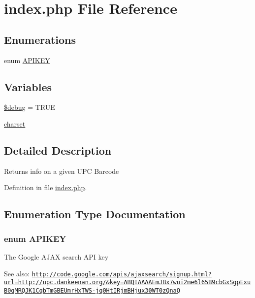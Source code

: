 \hypertarget{index_8php}{
\section{index.php File Reference}
\label{index_8php}
}
\subsection*{Enumerations}
\begin{CompactItemize}
\item 
enum \hyperlink{index_8php_cb68d0635f57ee9137fb7985a2357c5c}{APIKEY} 
\end{CompactItemize}
\subsection*{Variables}
\begin{CompactItemize}
\item 
\hyperlink{index_8php_85ae3e64cd40e9564adceb010085e9dd}{\$debug} = TRUE
\item 
\hyperlink{index_8php_8bd4accafd4e712317ed9a471738a971}{charset}
\end{CompactItemize}


\subsection{Detailed Description}
Returns info on a given UPC Barcode 

Definition in file \hyperlink{index_8php-source}{index.php}.

\subsection{Enumeration Type Documentation}
\hypertarget{index_8php_cb68d0635f57ee9137fb7985a2357c5c}{
\subsubsection{\setlength{\rightskip}{0pt plus 5cm}enum {\bf APIKEY}}}
\label{index_8php_cb68d0635f57ee9137fb7985a2357c5c}


The Google AJAX search API key \begin{Desc}
\item[See also:]\href{http://code.google.com/apis/ajaxsearch/signup.html?url=http://upc.dankeenan.org/&key=ABQIAAAAEmJBx7wui2me6l65B9cbGxSgpExuB0qMRQJK1CqbTmGBEUmrHxTWS-jq0HtIRjmBHjux30WT0zQnaQ}{\tt http://code.google.com/apis/ajaxsearch/signup.html?url=http://upc.dankeenan.org/\&key=ABQIAAAAEmJBx7wui2me6l65B9cbGxSgpExuB0qMRQJK1CqbTmGBEUmrHxTWS-jq0HtIRjmBHjux30WT0zQnaQ} \end{Desc}


